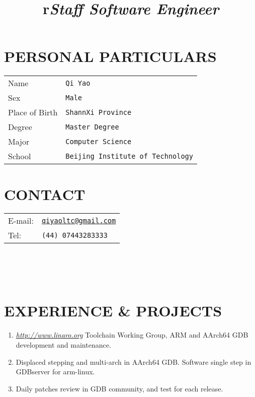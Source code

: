 \begin{resume}

\section{\textsc{PERSONAL PARTICULARS}}
\begin{tabular}{l l}
Name & \texttt{Qi Yao} \\
Sex & \texttt{Male} \\
Place of Birth & \texttt{ShannXi Province} \\
Degree & \texttt{Master Degree} \\
Major & \texttt{Computer Science} \\
School & \texttt{Beijing Institute of Technology} \\
\end{tabular}
\section{\textsc{CONTACT}}
\begin{tabular}{l l}
E-mail: & \href{qiyaoltc@gmail.com}{\texttt{qiyaoltc@gmail.com}} \\
Tel: & \texttt{(44) 07443283333} \\
\end{tabular}

\begin{format}
  \title{r}\\
  \\
  \body\\
\end{format}

\section{\textsc{EXPERIENCE \& PROJECTS}}
\title{\emph{Staff Software Engineer}}
\begin{position}
  \begin{enumerate}
  \item[] \href{http://www.linaro.org}{\emph{http://www.linaro.org}} Toolchain Working Group, ARM and AArch64 GDB development and maintenance.
  \item[] Displaced stepping and multi-arch in AArch64 GDB.  Software single step in GDBserver for arm-linux.
  \item[] Daily patches review in GDB community, and test for each release.
  \end{enumerate}
\end{position}


\end{resume}

